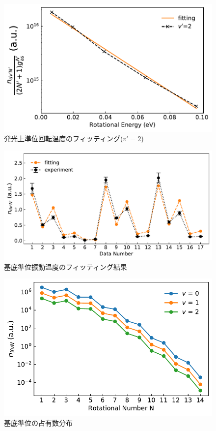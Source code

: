 \begin{figure}
    \centering
    \includegraphics[width=15cm]{pictures/upper-fitting-2.pdf}
    \caption{発光上準位回転温度のフィッティング($v'=2$)}
    \label{fig:upper-fitting-2}
\end{figure}

\begin{figure}
    \centering
    \includegraphics[width=15cm]{pictures/fitting-result.pdf}
    \caption{基底準位振動温度のフィッティング結果}
    \label{fig:fitting-result}
\end{figure}

\begin{figure}
    \centering
    \includegraphics[width=15cm]{pictures/ground-state-n.pdf}
    \caption{基底準位の占有数分布}
    \label{fig:ground-state-n}
\end{figure}

